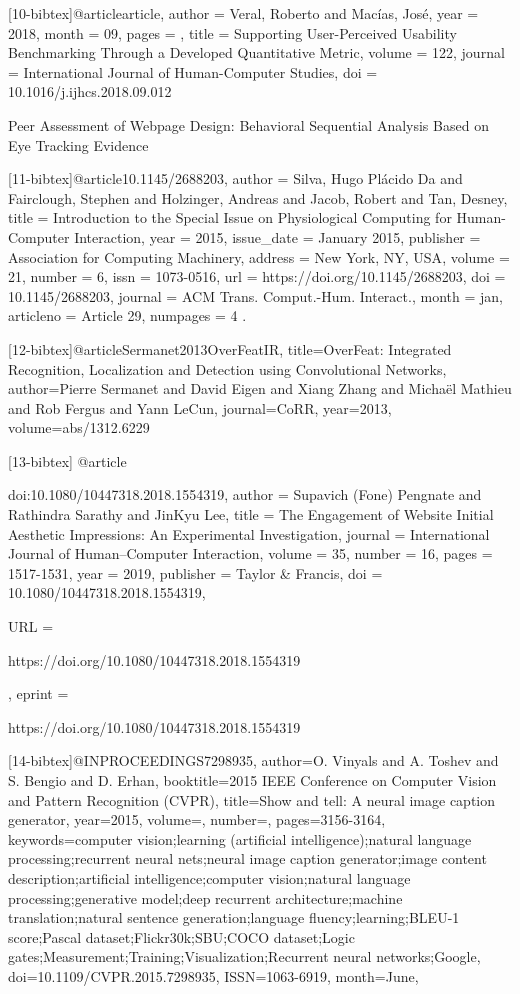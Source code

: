 [10-bibtex]@article{article,
author = {Veral, Roberto and Macías, José},
year = {2018},
month = {09},
pages = {},
title = {Supporting User-Perceived Usability Benchmarking Through a Developed Quantitative Metric},
volume = {122},
journal = {International Journal of Human-Computer Studies},
doi = {10.1016/j.ijhcs.2018.09.012}
}

Peer Assessment of Webpage Design: Behavioral Sequential Analysis Based on Eye Tracking Evidence 


[11-bibtex]@article{10.1145/2688203,
author = {Silva, Hugo Pl\'{a}cido Da and Fairclough, Stephen and Holzinger, Andreas and Jacob, Robert and Tan, Desney},
title = {Introduction to the Special Issue on Physiological Computing for Human-Computer Interaction},
year = {2015},
issue_date = {January 2015},
publisher = {Association for Computing Machinery},
address = {New York, NY, USA},
volume = {21},
number = {6},
issn = {1073-0516},
url = {https://doi.org/10.1145/2688203},
doi = {10.1145/2688203},
journal = {ACM Trans. Comput.-Hum. Interact.},
month = jan,
articleno = {Article 29},
numpages = {4}
}
  .



[12-bibtex]@article{Sermanet2013OverFeatIR,
  title={OverFeat: Integrated Recognition, Localization and Detection using Convolutional Networks},
  author={Pierre Sermanet and David Eigen and Xiang Zhang and Micha{\"e}l Mathieu and Rob Fergus and Yann LeCun},
  journal={CoRR},
  year={2013},
  volume={abs/1312.6229}
}


[13-bibtex]
@article{doi:10.1080/10447318.2018.1554319,
author = {Supavich (Fone) Pengnate and Rathindra Sarathy and JinKyu Lee},
title = {The Engagement of Website Initial Aesthetic Impressions: An Experimental Investigation},
journal = {International Journal of Human–Computer Interaction},
volume = {35},
number = {16},
pages = {1517-1531},
year  = {2019},
publisher = {Taylor & Francis},
doi = {10.1080/10447318.2018.1554319},

URL = { 
        https://doi.org/10.1080/10447318.2018.1554319
    
},
eprint = { 
        https://doi.org/10.1080/10447318.2018.1554319
    
}

}


[14-bibtex]@INPROCEEDINGS{7298935,
author={O. {Vinyals} and A. {Toshev} and S. {Bengio} and D. {Erhan}},
booktitle={2015 IEEE Conference on Computer Vision and Pattern Recognition (CVPR)},
title={Show and tell: A neural image caption generator},
year={2015},
volume={},
number={},
pages={3156-3164},
keywords={computer vision;learning (artificial intelligence);natural language processing;recurrent neural nets;neural image caption generator;image content description;artificial intelligence;computer vision;natural language processing;generative model;deep recurrent architecture;machine translation;natural sentence generation;language fluency;learning;BLEU-1 score;Pascal dataset;Flickr30k;SBU;COCO dataset;Logic gates;Measurement;Training;Visualization;Recurrent neural networks;Google},
doi={10.1109/CVPR.2015.7298935},
ISSN={1063-6919},
month={June},}


